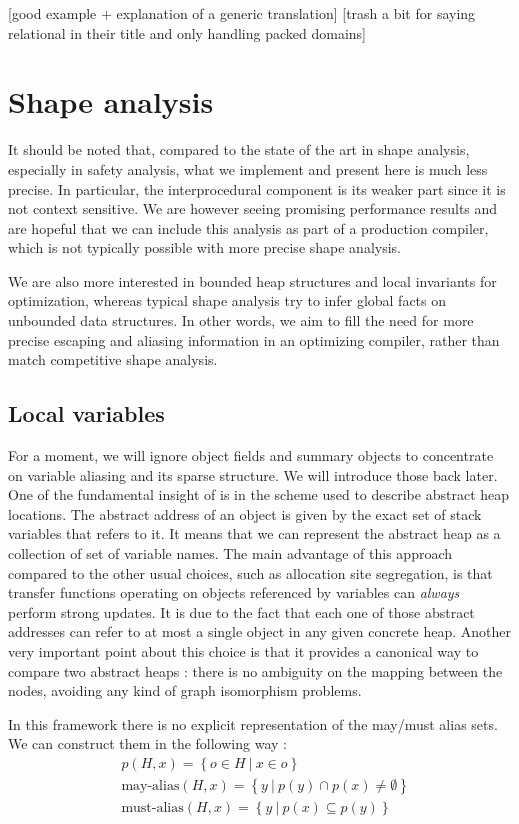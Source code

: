 \documentclass[11pt]{article}
\begin{document}
[good example + explanation of a generic translation]
[trash a bit \cite{sparse-nr} for saying relational in their title and only handling packed domains]

\section*{Shape analysis}

It should be noted that, compared to the state of the art in shape analysis, especially in safety analysis, what we implement and present here is much less precise.
In particular, the interprocedural component is its weaker part since it is not context sensitive.
We are however seeing promising performance results and are hopeful that we can include this analysis as part of a production compiler, which is not typically possible with more precise shape analysis.

We are also more interested in bounded heap structures and local invariants for optimization, whereas typical shape analysis try to infer global facts on unbounded data structures. In other words, we aim to fill the need for more precise escaping and aliasing information in an optimizing compiler, rather than match competitive shape analysis.

\subsection*{Local variables}
For a moment, we will ignore object fields and summary objects to concentrate on variable aliasing and its sparse structure. We will introduce those back later.
One of the fundamental insight of \cite{ssc} is in the scheme used to describe abstract heap locations.
The abstract address of an object is given by the exact set of stack variables that refers to it.
It means that we can represent the abstract heap as a collection of set of variable names.
The main advantage of this approach compared to the other usual choices, such as allocation site segregation, is that transfer functions operating on objects referenced by variables can \emph{always} perform strong updates.
It is due to the fact that each one of those abstract addresses can refer to at most a single object in any given concrete heap.
Another very important point about this choice is that it provides a canonical way to compare two abstract heaps : there is no ambiguity on the mapping between the nodes, avoiding any kind of graph isomorphism problems.

In this framework there is no explicit representation of the may/must alias sets.
We can construct them in the following way :
\begin{align*}
& p(H,x) = \left\{ o \in H ~|~ x \in o \right\} \\
& \text{may-alias}(H,x) = \left\{ y~|~ p(y)\cap p(x) \neq \emptyset \right\} \\
& \text{must-alias}(H,x) = \left\{ y~|~ p(x) \subseteq p(y) \right\}
\end{align*}
\end{document}
